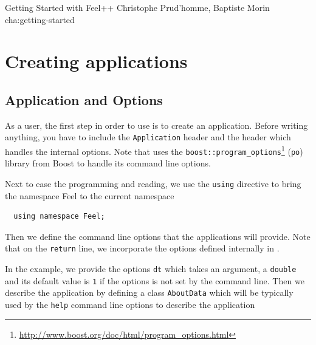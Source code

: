             {Getting Started with Feel++}
            {Christophe Prud'homme, Baptiste Morin}
            {cha:getting-started}


\section{Creating applications}
\label{sec:creat-appl}



\subsection{Application and Options}
\label{sec:options}

As a \feel user, the first step in order to use \feel is to create an
application. Before writing anything, you have to include the \lstinline!Application! header and the header which handles the internal \feel options.
Note that \feel uses the \lstinline!boost::program_options!\footnote{\url{http://www.boost.org/doc/html/program_options.html}} (\verb|po|)
library from Boost to handle its command line options.



Next to ease the programming and reading, we use the \lstinline!using!
\cpp directive to bring the namespace Feel to the current namespace

\begin{lstlisting}
  using namespace Feel;
\end{lstlisting}

Then we define the command line options that the applications will
provide. Note that on the \lstinline!return! line, we incorporate the
options defined internally in \feel.



In the example, we provide the options \lstinline!dt! which takes an
argument, a \lstinline!double! and its default value is \lstinline!1!
if the options is not set by the command line. Then we describe the application by defining a class
\lstinline!AboutData! which will be typically used by the
\lstinline!help! command line options to describe the application





